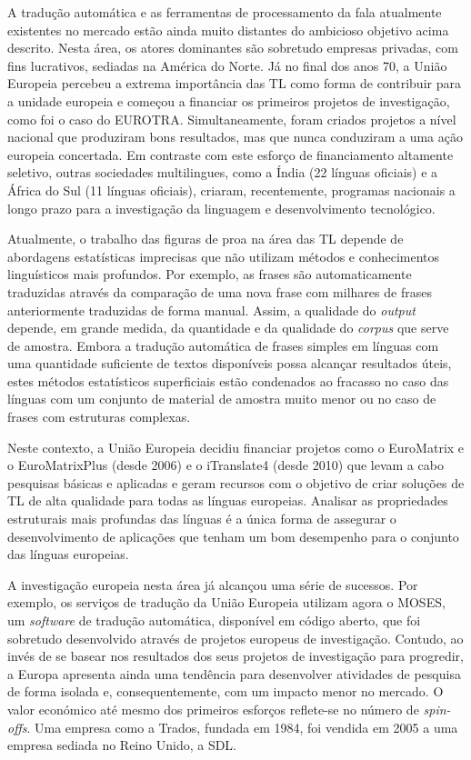 \begin{multicols}{2}

 A tradução automática e as ferramentas de processamento da fala atualmente existentes no mercado estão ainda muito distantes do ambicioso objetivo acima descrito. Nesta área, os atores dominantes são sobretudo empresas privadas, com fins lucrativos, sediadas na América do Norte. Já no final dos anos 70, a União Europeia percebeu a extrema importância das TL como forma de contribuir para a unidade europeia e começou a financiar os primeiros projetos de investigação, como foi o caso do EUROTRA. Simultaneamente, foram criados projetos a nível nacional que produziram bons resultados, mas que nunca conduziram a uma ação europeia concertada. Em contraste com este esforço de financiamento altamente seletivo, outras sociedades multilingues, como a Índia (22 línguas oficiais) e a África do Sul (11 línguas oficiais), criaram, recentemente, programas nacionais a longo prazo para a investigação da linguagem e desenvolvimento tecnológico.

Atualmente, o trabalho das figuras de proa na área das TL depende de abordagens estatísticas imprecisas que não utilizam métodos e conhecimentos linguísticos mais profundos. Por exemplo, as frases são automaticamente traduzidas através da comparação de uma nova frase com milhares de frases anteriormente traduzidas de forma manual. Assim, a qualidade do \textit{output} depende, em grande medida, da quantidade e da qualidade do \textit{corpus} que serve de amostra. Embora a tradução automática de frases simples em línguas com uma quantidade suficiente de textos disponíveis possa alcançar resultados úteis, estes métodos estatísticos superficiais estão condenados ao fracasso no caso das línguas com um conjunto de material de amostra muito menor ou no caso de frases com estruturas complexas. 

Neste contexto, a União Europeia decidiu financiar projetos como o EuroMatrix e o EuroMatrixPlus (desde 2006) e o iTranslate4 (desde 2010) que levam a cabo pesquisas básicas e aplicadas e geram recursos com o objetivo de criar soluções de TL de alta qualidade para todas as línguas europeias. A\-na\-li\-sar as propriedades estruturais mais profundas das línguas é a única forma de assegurar o desenvolvimento de aplicações que tenham um bom desempenho para o conjunto das línguas europeias.

A investigação europeia nesta área já alcançou uma série de sucessos. Por exemplo, os serviços de tradução da União Europeia utilizam agora o MOSES, um \textit{software} de tradução automática, disponível em código aberto, que foi sobretudo desenvolvido através de projetos europeus de investigação. Contudo, ao invés de se basear nos resultados dos seus projetos de investigação para progredir, a Europa apresenta ainda uma tendência para desenvolver atividades de pesquisa de forma isolada e, consequentemente, com um impacto menor no mercado. O valor económico até mesmo dos primeiros esforços reflete-se no número de \textit{spin-offs}. Uma empresa como a Trados, fundada em 1984, foi vendida em 2005 a uma empresa sediada no Reino Unido, a SDL.


\end{multicols}
